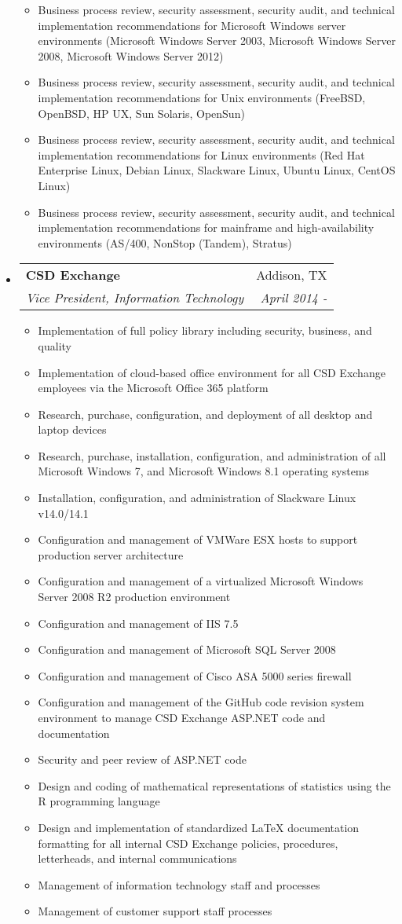 \documentclass[letterpaper,11pt]{article}
\makeatletter
\newcommand{\resitem}[1]{\item #1 \vspace{-2pt}}
\newcommand{\ressubheading}[4]{
\begin{tabular*}{6.5in}{l@{\cftdotfill{\cftsecdotsep}\extracolsep{\fill}}r}
		\textbf{#1} & #2 \\
		\textit{#3} & \textit{#4} \\
\end{tabular*}\vspace{-6pt}}
\makeatother
\begin{document}
\begin{itemize}
\begin{itemize}
            \resitem{Business process review, security assessment, security audit, and technical implementation recommendations for Microsoft Windows server environments (Microsoft Windows Server 2003, Microsoft Windows Server 2008, Microsoft Windows Server 2012)}
            \resitem{Business process review, security assessment, security audit, and technical implementation recommendations for Unix environments (FreeBSD, OpenBSD, HP UX, Sun Solaris, OpenSun)}
            \resitem{Business process review, security assessment, security audit, and technical implementation recommendations for Linux environments (Red Hat Enterprise Linux, Debian Linux, Slackware Linux, Ubuntu Linux, CentOS Linux)}
            \resitem{Business process review, security assessment, security audit, and technical implementation recommendations for mainframe and high-availability environments (AS/400, NonStop (Tandem), Stratus)}
	\end{itemize}

\item
	\ressubheading{CSD Exchange}{Addison, TX}{Vice President, Information Technology}{April 2014 - }
	\begin{itemize}
    \resitem{Implementation of full policy library including security, business, and quality}
    \resitem{Implementation of cloud-based office environment for all CSD Exchange employees via the Microsoft Office 365 platform}
    \resitem{Research, purchase, configuration, and deployment of all desktop and laptop devices}
    \resitem{Research, purchase, installation, configuration, and administration of all Microsoft Windows 7, and Microsoft Windows 8.1 operating systems}
    \resitem{Installation, configuration, and administration of Slackware Linux v14.0/14.1}
    \resitem{Configuration and management of VMWare ESX hosts to support production server architecture}
    \resitem{Configuration and management of a virtualized Microsoft Windows Server 2008 R2 production environment}
    \resitem{Configuration and management of IIS 7.5}
    \resitem{Configuration and management of Microsoft SQL Server 2008}
    \resitem{Configuration and management of Cisco ASA 5000 series firewall}
    \resitem{Configuration and management of the GitHub code revision system environment to manage CSD Exchange ASP.NET code and documentation}
    \resitem{Security and peer review of ASP.NET code}
    \resitem{Design and coding of mathematical representations of statistics using the R programming language}
    \resitem{Design and implementation of standardized LaTeX documentation formatting for all internal CSD Exchange policies, procedures, letterheads, and internal communications}
    \resitem{Management of information technology staff and processes}
    \resitem{Management of customer support staff processes}
	\end{itemize}


\end{itemize}
\end{document}
